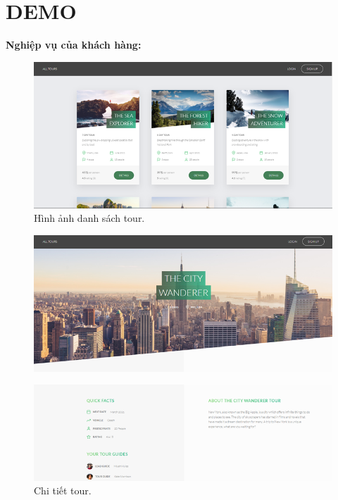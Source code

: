 \section{DEMO}


\textbf{Nghiệp vụ của khách hàng:}


\begin{figure}[ht]
    \centering
    \includegraphics[width = 1.2\linewidth]{figures/demo/1.png}
    \caption{Hình ảnh danh sách tour.}
    \label{fig:example_1}
\end{figure}

\vspace{10cm}


\begin{figure}[ht]
    \centering
    \includegraphics[width = 1.2\linewidth]{figures/demo/2.png}
    \label{fig:example_1}
\end{figure}
\begin{figure}[ht]
    \centering
    \includegraphics[width = 1.2\linewidth]{figures/demo/3.png}
    \caption{Chi tiết tour.}
    \label{fig:example_1}
\end{figure}

